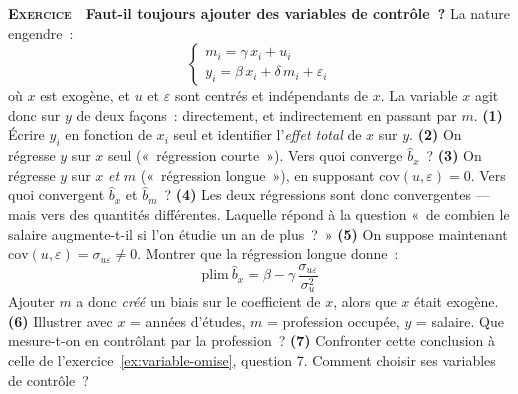\documentclass[10pt,a4paper,notitlepage]{article}
\newcounter{xnumber}
\newcommand{\exercice}{\refstepcounter{xnumber}\textsc{\textbf{Exercice}} \textbf{\thexnumber}\,\,}
\newcommand{\question}[1]{\textbf{(#1)}}
\begin{document}
\bigskip

\exercice\label{ex:mauvais-controle} \textbf{Faut-il toujours ajouter des
variables de contrôle~?} La nature engendre~:
\[
  \begin{cases}
    m_i = \gamma\,x_i + u_i\\
    y_i = \beta\,x_i + \delta\,m_i + \varepsilon_i
  \end{cases}
\]
où $x$ est exogène, et $u$ et $\varepsilon$ sont centrés et indépendants de $x$.
La variable $x$ agit donc sur $y$ de deux façons~: directement, et
indirectement en passant par $m$. \question{1} Écrire $y_i$ en fonction de
$x_i$ seul et identifier l'\emph{effet total} de $x$ sur $y$. \question{2} On
régresse $y$ sur $x$ seul («~régression courte~»). Vers quoi converge
$\hat b_x$~? \question{3} On régresse $y$ sur $x$ \emph{et} $m$ («~régression
longue~»), en supposant $\mathrm{cov}(u,\varepsilon)=0$. Vers quoi convergent
$\hat b_x$ et $\hat b_m$~? \question{4} Les deux régressions sont donc
convergentes --- mais vers des quantités différentes. Laquelle répond à la
question «~de combien le salaire augmente-t-il si l'on étudie un an de plus~?~»
\question{5} On suppose maintenant $\mathrm{cov}(u,\varepsilon)=\sigma_{u\varepsilon}\neq0$.
Montrer que la régression longue donne~:
\[
  \mathrm{plim}\ \hat b_x = \beta - \gamma\,\frac{\sigma_{u\varepsilon}}{\sigma_u^2}
\]
Ajouter $m$ a donc \emph{créé} un biais sur le coefficient de $x$, alors que $x$
était exogène. \question{6} Illustrer avec $x$ = années d'études, $m$ =
profession occupée, $y$ = salaire. Que mesure-t-on en contrôlant par la
profession~? \question{7} Confronter cette conclusion à celle de
l'exercice~\ref{ex:variable-omise}, question 7. Comment choisir ses variables de
contrôle~?\newline

\bigskip
\end{document}
